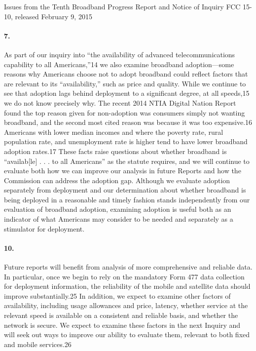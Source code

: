 Issues from the Tenth Broadband Progress Report and Notice of Inquiry FCC 15-10, released February 9, 2015~\cite{fcc2014progress-report}~\cite{fcc2015progress-report}

\paragraph{7. } As part of our inquiry into ``the availability of advanced telecommunications capability to all Americans,''14 we also examine broadband adoption—some reasons why Americans choose not to adopt broadband could reflect factors that are relevant to its ``availability,'' such as price and quality. While we continue to see that adoption lags behind deployment to a significant degree, at all speeds,15 we do not know precisely why. The recent 2014 NTIA Digital Nation Report found the top reason given for non-adoption was consumers simply not wanting broadband, and the second most cited reason was
because it was too expensive.16 Americans with lower median incomes and where the poverty rate, rural population rate, and unemployment rate is higher tend to have lower broadband adoption rates.17 These facts raise questions about whether broadband is ``availab[le] . . . to all Americans'' as the statute requires, and we will continue to evaluate both how we can improve our analysis in future Reports and how the Commission can address the adoption gap. Although we evaluate adoption separately from deployment and our determination about whether broadband is being deployed in a reasonable and timely fashion stands independently from our evaluation of broadband adoption, examining adoption is useful both as an indicator of what Americans may consider to be needed and separately as a stimulator for deployment.

\paragraph{10. }
Future reports will benefit from analysis of more comprehensive and reliable data. In particular, once we begin to rely on the mandatory Form 477 data collection for deployment information, the reliability of the mobile and satellite data should improve substantially.25 In addition, we expect to examine other factors of availability, including usage allowances and price, latency, whether service at the relevant speed is available on a consistent and reliable basis, and whether the network is secure. We expect to examine these factors in the next Inquiry and will seek out ways to improve our ability to evaluate them, relevant to both fixed and mobile services.26

